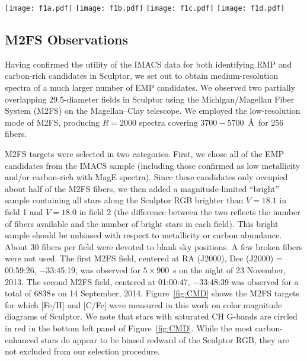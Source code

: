 \documentclass{emulateapj-rtx4}
\begin{document}
\begin{figure*}[!htbp]
\centering
\texttt{[image: f1a.pdf]}
\texttt{[image: f1b.pdf]}
\texttt{[image: f1c.pdf]}
\texttt{[image: f1d.pdf]}
\caption{Color magnitude diagrams (CMDs) of Sculptor from \citet{cdb+05}. M2FS targets
for which [Fe/H] and [C/Fe] are computed are over plotted. Top left: [Fe/H] of stars on the red giant branch of Sculptor
that were selected as the most metal-poor candidates. Top right: [Fe/H] of bright stars that were selected to fill available fibers. Much of the bright star sample was excluded from this work (see Section~\ref{sec:KP}). Bottom left: 
[C/Fe] of stars on the red giant branch of Sculptor that were selected to be metal-poor. Stars with saturated G-bands are circled in red. Bottom right:
[Fe/H] of all stars we observed that were selected to be metal-poor.}
\label{fig:CMD}
\end{figure*}


\subsection{M2FS Observations}

Having confirmed the utility of the IMACS data for both identifying EMP
and carbon-rich candidates in Sculptor, we set out to obtain medium-resolution spectra of a much
larger number of EMP candidates.  We observed two partially
overlapping 29.5\arcmin-diameter fields in Sculptor using the
Michigan/Magellan Fiber System (M2FS) \citep{mbc12} on
the Magellan--Clay telescope.  We
employed the low-resolution mode of M2FS, producing $R=2000$ spectra
covering $3700-5700$~\AA\ for 256 fibers.

M2FS targets were selected in two categories.  First, we chose all of
the EMP candidates from the IMACS sample (including those confirmed as
low metallicity and/or carbon-rich with MagE spectra).  Since these
candidates only occupied about half of the M2FS fibers, we then added
a magnitude-limited ``bright'' sample containing all stars along the Sculptor RGB 
brighter than $V=18.1$ in field 1 and $V=18.0$ in field 2
(the difference between the two reflects the number of fibers
available and the number of bright stars in each field).  This bright
sample should be unbiased with respect to metallicity or carbon
abundance.  About 30 fibers per field were devoted to blank sky
positions. A few broken fibers were not used.  The first M2FS
field, centered at RA (J2000), Dec (J2000) = 00:59:26, $-33$:45:19, was
observed for $5\times900$~s on the night of 23 November, 2013.  The second
M2FS field, centered at 01:00:47, $-33$:48:39 was observed for a
total of 6838\,s on 14 September, 2014. Figure~\ref{fig:CMD} shows
the M2FS targets for which [Fe/H] and [C/Fe] were measured in this work on
color magnitude diagrams of Sculptor. 
We note that stars with saturated CH G-bands are circled in red in the bottom left panel of Figure~\ref{fig:CMD}.
While the most carbon-enhanced stars do appear to be biased redward of the Sculptor RGB, they are not excluded from our selection procedure.
\end{document}
